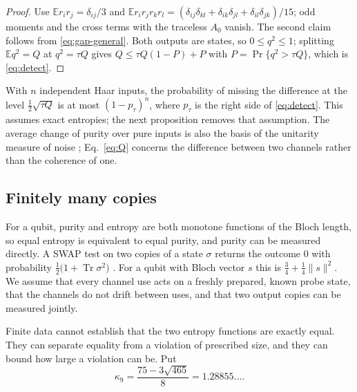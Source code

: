 \documentclass[12pt,a4paper]{article}
\begin{document}
\begin{proof}
Use $\mathbb E r_ir_j=\delta_{ij}/3$ and $\mathbb E r_ir_jr_kr_l=(\delta_{ij}\delta_{kl}+\delta_{ik}\delta_{jl}+\delta_{il}\delta_{jk})/15$; odd moments and the cross terms with the traceless $A_0$ vanish. The second claim follows from \eqref{eq:gap-general}. Both outputs are states, so $0\le q^2\le1$; splitting $\mathbb E q^2=Q$ at $q^2=\tau Q$ gives $Q\le\tau Q(1-P)+P$ with $P=\Pr\{q^2>\tau Q\}$, which is \eqref{eq:detect}.
\end{proof}

With $n$ independent Haar inputs, the probability of missing the difference at the level $\tfrac12\sqrt{\tau Q}$ is at most $(1-p_\tau)^n$, where $p_\tau$ is the right side of \eqref{eq:detect}. This assumes exact entropies; the next proposition removes that assumption. The average change of purity over pure inputs is also the basis of the unitarity measure of noise \cite{Wallman2015}; Eq.~\eqref{eq:Q} concerns the difference between two channels rather than the coherence of one.

\subsection{Finitely many copies}

For a qubit, purity and entropy are both monotone functions of the Bloch length, so equal entropy is equivalent to equal purity, and purity can be measured directly. A SWAP test on two copies of a state $\sigma$ returns the outcome $0$ with probability $\tfrac12\bigl(1+\operatorname{Tr}\sigma^2\bigr)$ \cite{Buhrman2001}. For a qubit with Bloch vector $s$ this is $\tfrac34+\tfrac14\|s\|^2$. We assume that every channel use acts on a freshly prepared, known probe state, that the channels do not drift between uses, and that two output copies can be measured jointly.

Finite data cannot establish that the two entropy functions are exactly equal. They can separate equality from a violation of prescribed size, and they can bound how large a violation can be. Put
\[
\kappa_9=\frac{75-3\sqrt{465}}{8}=1.28855\ldots .
\]
\end{document}
